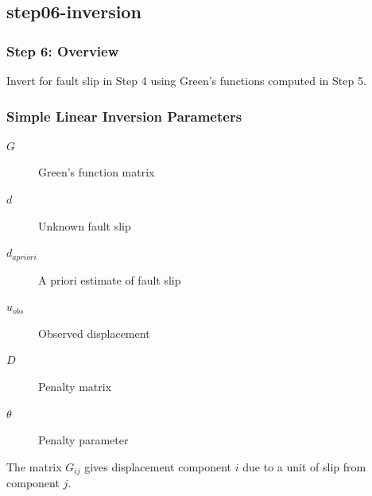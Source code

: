 \documentclass{beamer}
\begin{document}
\subsection{step06-inversion}

\begin{frame}
  \frametitle{Step 6: Overview}
  \summary{}

  Invert for fault slip in Step 4 using Green's functions computed in Step 5.
      
\end{frame}


\begin{frame}
  \frametitle{Simple Linear Inversion Parameters}
  \summary{}

  \begin{description}
  \item[$G$] Green's function matrix
  \item[$d$] Unknown fault slip
  \item[$d_\mathit{apriori}$] A priori estimate of fault slip
  \item[$u_\mathit{obs}$] Observed displacement
  \item[$D$] Penalty matrix
  \item[$\theta$] Penalty parameter
  \end{description}
  
  \vfill
  The matrix $G_{ij}$ gives displacement component $i$ due to a unit of slip from component $j$.

\end{frame}
\end{document}
